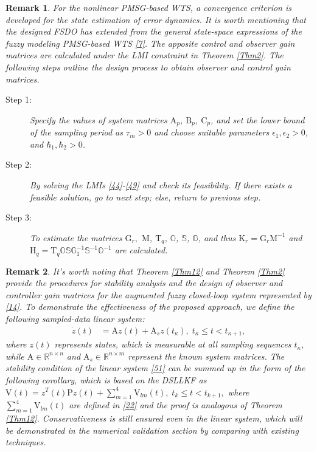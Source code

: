 \documentclass[preprint,11pt]{elsarticle}
\newtheorem{remark}{Remark}
\begin{document}
\begin{remark}
{For the nonlinear PMSG-based WTS, a convergence criterion is developed for the state estimation of error dynamics. It is worth mentioning that the designed FSDO has extended from the general state-space expressions of the fuzzy modeling PMSG-based WTS \eqref{7}. The apposite control and observer gain matrices are calculated under the LMI constraint in Theorem \ref{Thm2}. The following steps outline the design process to obtain observer and control gain matrices.
\begin{description}
\item[Step 1:] Specify the values of system matrices $\mathrm{A}_{p}$, $\mathrm{B}_{p}$, $\mathrm{C}_{p}$, and set the lower bound of the sampling period as $\tau_m>0$ and
choose suitable parameters $\epsilon_1,\epsilon_2>0$, and $\hbar_1,\hbar_2>0$.
\item[Step 2:] By solving the LMIs \eqref{44}-\eqref{49} and check its feasibility. If there exists a feasible solution, go to next step; else, return to previous step.
\item[Step 3:] To estimate the matrices $\mathrm{G}_{r},$ $\mathrm{M}$, $\mathrm{T}_{q}$, $\mathbb{O}$, $\mathbb{S}$, $\mathbb{G}$, and thus
$\mathrm{K}_{r}=\mathrm{G}_{r} \mathrm{M}^{-1}$ and
$\mathrm{H}_{q}=\mathrm{T}_{q} \mathbb{O}\mathbb{S}\mathbb{G}^{-1}_1\mathbb{S}^{-1}\mathbb{O}^{-1}$ are calculated.
\end{description}
}
\end{remark}
\vspace{-0.6cm}
\begin{remark}
It's worth noting that Theorem \ref{Thm12} and Theorem \ref{Thm2} provide the procedures for stability analysis and the design of observer and controller gain matrices for the augmented fuzzy closed-loop system represented by \eqref{14}. To demonstrate the effectiveness of the proposed approach, we define the following sampled-data linear system:
\begin{align}\label{51}
\dot{z}(t)&=\mathrm{A}z(t)+\mathrm{A}_s{z}(t_\kappa),\;t_\kappa\leq t<t_{\kappa+1},
\end{align}
where $z(t)$ represents states, which is measurable at all sampling sequences $t_\kappa$, while $\mathrm{A}\in \mathbb{R}^{n\times n}$ and $\mathrm{A}_s\in \mathbb{R}^{n\times m}$ represent the known system matrices. The stability condition of the linear system \eqref{51} can be summed up in the form of the following corollary, which is based on the DSLLKF as
$
\mathrm{V}(t)=z^T(t)\mathrm{P}z(t)+\sum^4_{m=1}\mathrm{V}_{lm}(t),\;t_k\leq t<t_{k+1},
$
where $\sum^4_{m=1}\mathrm{V}_{lm}(t)$ are defined in \eqref{22} and the proof is analogous of Theorem \ref{Thm12}. Conservativeness is still ensured even in the linear system, which will be demonstrated in the numerical validation section by comparing with existing techniques.
\end{remark}
\end{document}

